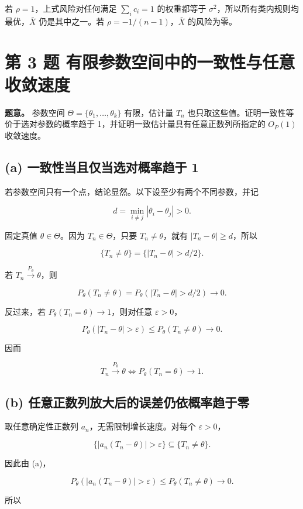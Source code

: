 若 $\rho=1$，上式风险对任何满足 $\sum_i c_i=1$ 的权重都等于 $\sigma^2$，所以所有类内规则均最优，$\bar X$ 仍是其中之一。若 $\rho=-1/(n-1)$，$\bar X$ 的风险为零。

\section{第 3 题 有限参数空间中的一致性与任意收敛速度}

\textbf{题意。} 参数空间 $\Theta=\{\theta_1,\ldots,\theta_k\}$ 有限，估计量 $T_n$ 也只取这些值。证明一致性等价于选对参数的概率趋于 1，并证明一致估计量具有任意正数列所指定的 $O_P(1)$ 收敛速度。

\subsection{(a) 一致性当且仅当选对概率趋于 1}

若参数空间只有一个点，结论显然。以下设至少有两个不同参数，并记

\[
d=\min_{i\ne j}|\theta_i-\theta_j|>0.
\]

固定真值 $\theta\in\Theta$。因为 $T_n\in\Theta$，只要 $T_n\ne\theta$，就有 $|T_n-\theta|\ge d$，所以

\[
\{T_n\ne\theta\}=\{|T_n-\theta|>d/2\}.
\]

若 $T_n\xrightarrow{P_\theta}\theta$，则

\[
P_\theta(T_n\ne\theta)
=P_\theta(|T_n-\theta|>d/2)\to0.
\]

反过来，若 $P_\theta(T_n=\theta)\to1$，则对任意 $\varepsilon>0$，

\[
P_\theta(|T_n-\theta|>\varepsilon)
\le P_\theta(T_n\ne\theta)\to0.
\]

因而

\[
\boxed{T_n\xrightarrow{P_\theta}\theta
\iff P_\theta(T_n=\theta)\to1.}
\]

\subsection{(b) 任意正数列放大后的误差仍依概率趋于零}

取任意确定性正数列 $a_n$，无需限制增长速度。对每个 $\varepsilon>0$，

\[
\{|a_n(T_n-\theta)|>\varepsilon\}\subseteq\{T_n\ne\theta\}.
\]

因此由 (a)，

\[
P_\theta(|a_n(T_n-\theta)|>\varepsilon)
\le P_\theta(T_n\ne\theta)\to0.
\]

所以

